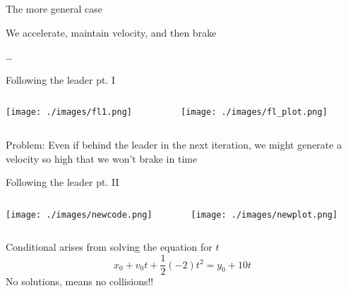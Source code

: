 \documentclass{beamer}
\begin{document}
\begin{frame}{The more general case}

        We accelerate, maintain velocity, and then brake

        \vspace{0.5cm}
        \centering 

        \Large{\dots}
        \end{frame}

\begin{frame}{Following the leader pt. I}
  \begin{minipage}[0.3\textheight]{\textwidth}
  \begin{columns}[c]
  \begin{column}{0.45\textwidth}
   \hspace{0.3cm}
   \texttt{[image: ./images/fl1.png]}
  \end{column}
  \begin{column}{1\textwidth}
    \texttt{[image: ./images/fl\_plot.png]}
  \end{column}
  \end{columns}
  \end{minipage}

  \pause
  Problem: Even if behind the leader in the next iteration, we might
  generate a velocity so high that we won't brake in time
\end{frame}

\begin{frame}{Following the leader pt. II}
  \begin{minipage}[1\textheight]{\textwidth}
  \begin{columns}[c]
  \begin{column}{0.45\textwidth}
          \hspace{0.4cm} 
          \texttt{[image: ./images/newcode.png]}
  \end{column}
  \begin{column}{1\textwidth}
    \texttt{[image: ./images/newplot.png]}
  \end{column}
  \end{columns}
  \end{minipage}

  \pause
  \vspace{0.5cm}
  Conditional arises from \alert{solving} the equation for $t$
  \[
        x_0 + v_0t + \frac{1}{2}(-2)t^2 = y_0 + 10t\ 
  \]
  No solutions, means no collisions!!
\end{frame}
\end{document}
